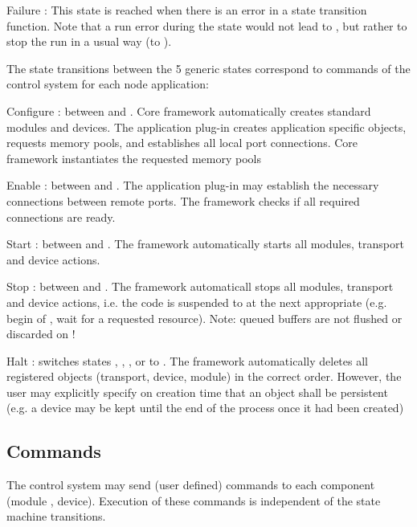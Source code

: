 \begin{compactitem}[$\circ$]
\begin{compactdesc}
\item[Failure] : This state is reached when there is an error in a 
	 state transition function. Note that a run error during the 
	  state would not lead to , but rather to stop 
	 the run in a usual way (to ).
\end{compactdesc}
\item  The state transitions between the 5 generic states correspond to 
      commands of the control system for each node application:
\begin{compactdesc}
\item[Configure] : between  and . Core 
	 framework automatically creates standard modules and 
	 devices. The application plug-in  creates application 
	 specific objects, requests memory pools, and establishes all 
	 local port connections. Core framework instantiates the 
	 requested memory pools
\item[Enable] : between  and . 
	 The application plug-in may establish the necessary 
	 connections between remote ports. The framework checks if 
	 all required connections are ready.
\item[Start]  : between  and . The framework automatically 
	 starts all modules, transport and device actions.
\item[Stop] : between  and . The framework automaticall 
	 stops all modules, transport and device actions, 
	 i.e. the code is suspended to  at the next appropriate 
	  (e.g. begin of , wait for a requested resource). 
	 Note: queued buffers are not flushed or discarded on  !
\item[Halt] : switches states  ,  , , or 
	  to . The framework automatically deletes all 
	 registered objects (transport, device, module) 
	 in the correct order. However, the user may explicitly specify on 
	 creation time that an object shall be persistent (e.g. a device may 
	 be kept until the end of the process once it had been created) 
\end{compactdesc}
\end{compactitem}
\subsection{Commands}
The control system may send (user defined) commands to each 
   component (module , device). Execution of these commands is 
   independent of the state machine transitions.
